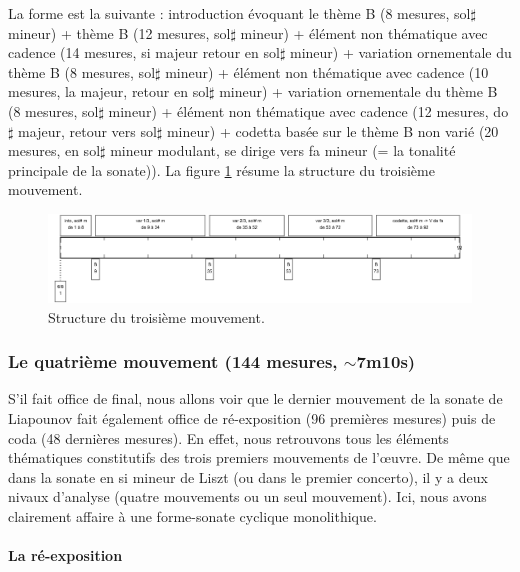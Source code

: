 La forme est la suivante : introduction évoquant le thème B (8 mesures, sol$\sharp$ mineur) + thème B (12 mesures, sol$\sharp$ mineur) + élément non thématique avec cadence (14 mesures, si majeur retour en sol$\sharp$ mineur) + variation ornementale du thème B (8 mesures, sol$\sharp$ mineur) + élément non thématique avec cadence (10 mesures, la majeur, retour en sol$\sharp$ mineur) + variation ornementale du thème B (8 mesures, sol$\sharp$ mineur) + élément non thématique avec cadence (12 mesures, do$\sharp$ majeur, retour vers sol$\sharp$ mineur) + codetta basée sur le thème B non varié (20 mesures, en sol$\sharp$ mineur modulant, se dirige vers fa mineur (= la tonalité principale de la sonate)). La figure \ref{schema-3} résume la structure du troisième mouvement.

\begin{figure}[!ht]
  \begin{bigcenter}
    \includegraphics[width=17.5cm, keepaspectratio]{frise-mvt3.png}
  \end{bigcenter}
  \caption{\label{schema-3}Structure du troisième mouvement.}
\end{figure}

\subsubsection*{Le quatrième mouvement (144 mesures, $\sim$7m10s)}

S'il fait office de final, nous allons voir que le dernier mouvement de la sonate de Liapounov fait également office de ré-exposition (96 premières mesures) puis de coda (48 dernières mesures). En effet, nous retrouvons tous les éléments thématiques constitutifs des trois premiers mouvements de l'œuvre. De même que dans la sonate en si mineur de Liszt (ou dans le premier concerto), il y a deux nivaux d'analyse (quatre mouvements ou un seul mouvement). Ici, nous avons clairement affaire à une forme-sonate cyclique monolithique.

\paragraph{La ré-exposition}

